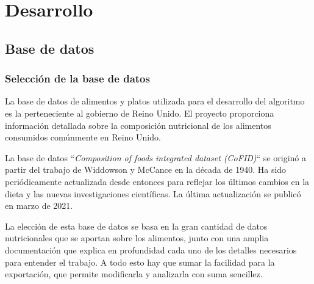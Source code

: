 \chapter{Desarrollo}
\label{ch:desarrollo}


\section{Base de datos}

\subsection{Selección de la base de datos}
La base de datos de alimentos y platos utilizada para el desarrollo del algoritmo es la perteneciente al gobierno de Reino Unido. El proyecto proporciona información detallada sobre la composición nutricional de los alimentos consumidos comúnmente en Reino Unido.~\cite{cofid2021}

La base de datos ``\textit{Composition of foods integrated dataset (CoFID)}`` se originó a partir del trabajo de Widdowson y McCance en la década de 1940. Ha sido periódicamente actualizada desde entonces para reflejar los últimos cambios en la dieta y las nuevas investigaciones científicas. La última actualización se publicó en marzo de 2021.

La elección de esta base de datos se basa en la gran cantidad de datos nutricionales que se aportan sobre los alimentos, junto con una amplia documentación que explica en profundidad cada uno de los detalles necesarios para entender el trabajo. A todo esto hay que sumar la facilidad para la exportación, que permite modificarla y analizarla con suma sencillez.

